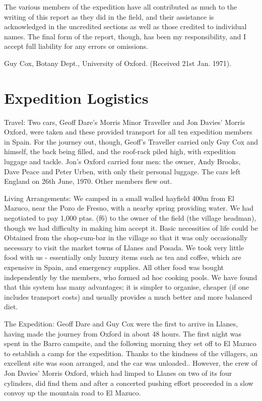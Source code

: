 \documentclass[11pt, a4paper, twoside]{memoir}
\begin{document}
The various members of the expedition have all contributed as much to the writing of this report as they did in the field, and their assistance is acknowledged in the uncredited sections as well as those credited to individual names. The final form of the report, though, has been my responsibility, and I accept full liability for any errors or omissions.

Guy Cox, Botany Dept., University of Oxford. (Received 21st Jan. 1971).


\chapter{Expedition Logistics}


Travel: Two cars, Geoff Dare's Morris Minor Traveller and Jon Davies' Morris Oxford, were taken and these provided transport for all ten expedition members in Spain. For the journey out, though, Geoff's Traveller carried only Guy Cox and himself, the back being filled, and the roof-rack piled high, with expedition luggage and tackle. Jon's Oxford carried four men: the owner, Andy Brooks, Dave Peace and Peter Urben, with only their personal luggage. The cars left England on 26th June, 1970. Other members flew out.

Living Arrangements: We camped in a small walled hayfield 400m from El Mazuco, near the Pozo de Fresno, with a nearby spring providing water. We had negotiated to pay 1,000 ptas. (f6) to the owner of the field (the village headman), though we had difficulty in making him accept it. Basic necessities of life could be Obtained from the shop-cum-bar in the village so that it was only occasionally necessary to visit the market towns of Llanes and Posada. We took very little food with us - essentially only luxury items such as tea and coffee, which are expensive in Spain, and emergency supplies. All other food was bought independently by the members, who formed ad hoc cooking pools. We have found that this system has many advantages; it is simpler to organise, cheaper (if one includes transport costs) and usually provides a much better and more balanced diet.

The Expedition: Geoff Dare and Guy Cox were the first to arrive in Llanes, having made the journey from Oxford in about 48 hours. The first night was spent in the Barro campsite, and the following morning they set off to El Mazuco to establish a camp for the expedition. Thanks to the kindness of the villagers, an excellent site was soon arranged, and the car was unloaded.. However, the crew of Jon Davies' Morris Oxford, which had limped to Llanes on two of its four cylinders, did find them and after a concerted pushing effort proceeded in a slow convoy up the mountain road to El Mazuco.
\end{document}
